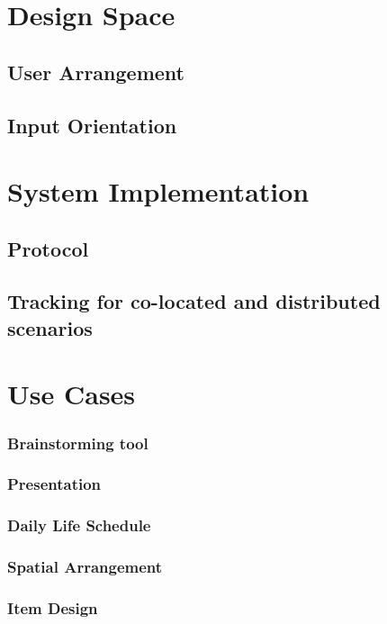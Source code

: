 \documentclass{sigchi}
\begin{document}
\section{Design Space}
\subsection{User Arrangement}
\subsection{Input Orientation}

\section{System Implementation}
\subsection{Protocol}
\subsection{Tracking for co-located and distributed scenarios}

\section{Use Cases}
\subsubsection{Brainstorming tool}
\subsubsection{Presentation}
\subsubsection{Daily Life Schedule}
\subsubsection{Spatial Arrangement}
\subsubsection{Item Design}

\end{document}
